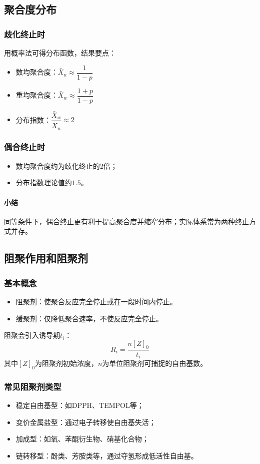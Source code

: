 ﻿\documentclass[12pt,a4paper]{article}
\begin{document}
\subsection{聚合度分布}
\subsubsection{歧化终止时}
用概率法可得分布函数，结果要点：
\begin{itemize}
  \item 数均聚合度：$\bar{X}_n\approx\dfrac{1}{1-p}$
  \item 重均聚合度：$\bar{X}_w\approx\dfrac{1+p}{1-p}$
  \item 分布指数：$\dfrac{\bar{X}_w}{\bar{X}_n}\approx2$
\end{itemize}

\subsubsection{偶合终止时}
\begin{itemize}
  \item 数均聚合度约为歧化终止的2倍；
  \item 分布指数理论值约$1.5$。
\end{itemize}

\paragraph{小结}
同等条件下，偶合终止更有利于提高聚合度并缩窄分布；实际体系常为两种终止方式并存。

\subsection{阻聚作用和阻聚剂}
\subsubsection{基本概念}
\begin{itemize}
  \item 阻聚剂：使聚合反应完全停止或在一段时间内停止。
  \item 缓聚剂：仅降低聚合速率，不使反应完全停止。
\end{itemize}
阻聚会引入诱导期$t_i$：
\[
R_i=\frac{n[Z]_0}{t_i}
\]
其中$[Z]_0$为阻聚剂初始浓度，$n$为单位阻聚剂可捕捉的自由基数。

\subsubsection{常见阻聚剂类型}
\begin{itemize}
  \item 稳定自由基型：如DPPH、TEMPOL等；
  \item 变价金属盐型：通过电子转移使自由基失活；
  \item 加成型：如氧、苯醌衍生物、硝基化合物；
  \item 链转移型：酚类、芳胺类等，通过夺氢形成低活性自由基。
\end{itemize}
\end{document}
